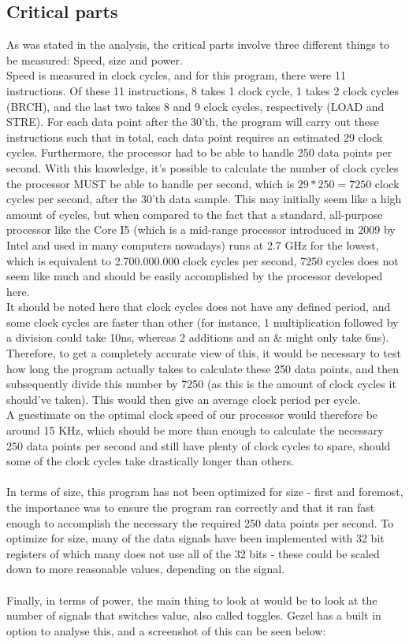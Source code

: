 \documentclass[12pt,a4paper]{article}
\begin{document}
\subsection{Critical parts}
	As was stated in the analysis, the critical parts involve three different things to be measured: Speed, size and power.\\
	Speed is measured in clock cycles, and for this program, there were 11 instructions. Of these 11 instructions, 8 takes 1 clock cycle, 1 takes 2 clock cycles (BRCH), and the last two takes 8 and 9 clock cycles, respectively (LOAD and STRE). For each data point after the 30'th, the program will carry out these instructions such that in total, each data point requires an estimated 29 clock cycles. Furthermore, the processor had to be able to handle 250 data points per second. With this knowledge, it's possible to calculate the number of clock cycles the processor MUST be able to handle per second, which is $29*250=7250$ clock cycles per second, after the 30'th data sample. This may initially seem like a high amount of cycles, but when compared to the fact that a standard, all-purpose processor like the Core I5 (which is a mid-range processor introduced in 2009 by Intel and used in many computers nowadays) runs at 2.7 GHz for the lowest, which is equivalent to 2.700.000.000 clock cycles per second, 7250 cycles does not seem like much and should be easily accomplished by the processor developed here.\\
	It should be noted here that clock cycles does not have any defined period, and some clock cycles are faster than other (for instance, 1 multiplication followed by a division could take 10ns, whereas 2 additions and an \& might only take 6ns). Therefore, to get a completely accurate view of this, it would be necessary to test how long the program actually takes to calculate these 250 data points, and then subsequently divide this number by 7250 (as this is the amount of clock cycles it should've taken). This would then give an average clock period per cycle.\\
	A guestimate on the optimal clock speed of our processor would therefore be around 15 KHz, which should be more than enough to calculate the necessary 250 data points per second and still have plenty of clock cycles to spare, should some of the clock cycles take drastically longer than others.\\
	\\
	In terms of size, this program has not been optimized for size - first and foremost, the importance was to ensure the program ran correctly and that it ran fast enough to accomplish the necessary the required 250 data points per second. To optimize for size, many of the data signals have been implemented with 32 bit registers of which many does not use all of the 32 bits - these could be scaled down to more reasonable values, depending on the signal.\\
	\\
	Finally, in terms of power, the main thing to look at would be to look at the number of signals that switches value, also called toggles. Gezel has a built in option to analyse this, and a screenshot of this can be seen below:\
\end{document}
